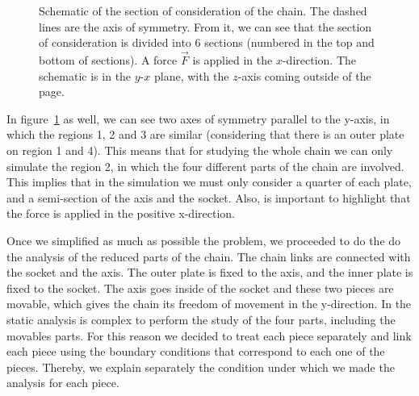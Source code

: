 \documentclass[a4paper 12pt]{article}
\begin{document}
\begin{figure}[!htbp]
\begin{center}
\end{center}
\caption{Schematic of the section of consideration of the chain. The dashed lines are the axis of symmetry. From it, we can see that the section of consideration is divided into 6 sections (numbered in the top and bottom of sections). A force $\vec{F}$ is applied in the $x$-direction. The schematic is in the $y$-$x$ plane, with the $z$-axis coming outside of the page.}
\label{chain_union}
\end{figure}

In figure~\ref{chain_union} as well, we can see two axes of symmetry parallel to the y-axis, in which the regions 1, 2 and 3 are similar (considering that there is an outer plate on region 1 and 4). This means that for studying the whole chain we can only simulate the region 2, in which the four different parts of the chain are involved. This implies that in the simulation we must only consider a quarter of each plate, and a semi-section of the axis and the socket. Also, is important to highlight that the force is applied in the positive x-direction.

Once we simplified as much as possible the problem, we proceeded to do the do the analysis of the reduced parts of the chain. The chain links are connected with the socket and the axis. The outer plate is fixed to the axis, and the inner plate is fixed to the socket. The axis goes inside of the socket and these two pieces are movable, which gives the chain its freedom of movement in the y-direction. In the static analysis is complex to perform the study of the four parts, including the movables parts. For this reason we decided to treat each piece separately and link each piece using the boundary conditions that correspond to each one of the pieces. Thereby, we explain separately the condition under which we made the analysis for each piece.
\end{document}
